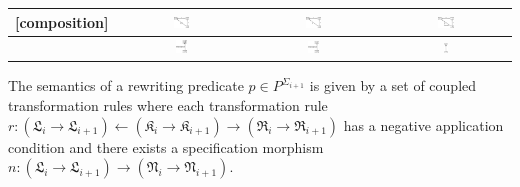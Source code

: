 \documentclass{eceasst}
\begin{document}
\begin{table}[h]
\begin{center}
\begin{tabular}{| l | c | c | c | }
    [composition] 	& \includegraphics[width=0.13\textwidth]{comp-L.pdf} & \includegraphics[width=0.13\textwidth]{comp-R.pdf} & \includegraphics[width=0.13\textwidth]{comp-vis.pdf}  \\ \hline 			
    [inheritance] 	& \includegraphics[width=0.09\textwidth]{inheritance-L.pdf} & \includegraphics[width=0.09\textwidth]{inheritance-R.pdf} & \includegraphics[width=0.03\textwidth]{inheritance-vis.pdf}  \\ 
    \hline    
    \end{tabular}
    \end{center}
\end{table}
\normalsize

\begin{definition}
 The semantics of a rewriting predicate $p \in P^{\Sigma_{i+1}}$ is given by a set of coupled transformation rules where each transformation 
 rule $r: (\mathfrak{L}_i \rightarrow \mathfrak{L}_{i+1})   \leftarrow (\mathfrak{K}_i \rightarrow \mathfrak{K}_{i+1})  \rightarrow 
 (\mathfrak{R}_i \rightarrow \mathfrak{R}_{i+1}) $ has a negative application condition and there exists a specification morphism 
 $n: (\mathfrak{L}_i \rightarrow \mathfrak{L}_{i+1}) \rightarrow (\mathfrak{N}_i \rightarrow \mathfrak{N}_{i+1}) $. 
\end{definition}
\end{document}

